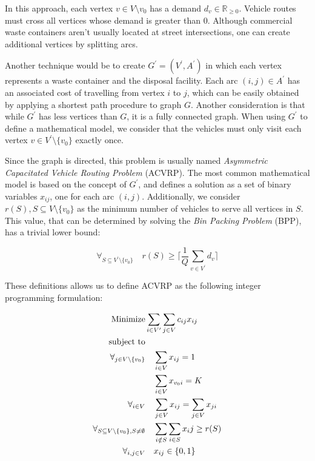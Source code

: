 In this approach, each vertex $v \in V \setminus {v_0}$ has a demand $d_v \in
\mathbb{R}_{\geq0}$. Vehicle routes must cross all vertices whose demand is
greater than $0$. Although commercial waste containers aren't usually located
at street intersections, one can create additional vertices by splitting arcs.

Another technique would be to create $G^\prime = (V^\prime, A^\prime)$ in which
each vertex represents a waste container and the disposal facility. Each arc
$(i, j) \in A^\prime$ has an associated cost of travelling from vertex $i$ to
$j$, which can be easily obtained by applying a shortest path procedure to
graph $G$. Another consideration is that while $G^\prime$ has less vertices
than $G$, it is a fully connected graph. When using $G^\prime$ to define a
mathematical model, we consider that the vehicles must only visit each vertex
$v \in V^\prime \setminus \{v_0\}$ exactly once.

Since the graph is directed, this problem is usually named \textit{Asymmetric
Capacitated Vehicle Routing Problem} (ACVRP).  The most common mathematical
model\citep{Toth01} is based on the concept of $G^\prime$, and defines a
solution as a set of binary variables $x_{ij}$, one for each arc $(i, j)$.
Additionally, we consider $r(S), S \subseteq V \setminus \{v_0\}$ as the
minimum number of vehicles to serve all vertices in $S$. This value, that can
be determined by solving the \textit{Bin Packing Problem} (BPP), has a trivial
lower bound:

\begin{equation}
\forall_{S \subseteq V^\prime \setminus \{v_0\}} \quad r(S) \geq
\lceil\frac{1}{Q} \sum_{v \in V^\prime} d_{v} \rceil
\end{equation}

These definitions allows us to define ACVRP as the following integer
programming formulation:

\begin{align}
	\mbox{Minimize} & \sum_{i \in V^\prime} \sum_{j \in V} c_{ij} x_{ij}
	\\
	\mbox{subject to} & \notag{}
	\\
	\forall_{j \in V \setminus \{v_0\}} & \quad \sum_{i \in V} x_{ij} = 1
	\label{acvrp:indegree}
	\\
	& \quad \sum_{i \in V} x_{v_0i} = K
	\label{acvrp:outdepot}
	\\
	\forall_{i \in V} & \quad \sum_{j \in V} x_{ij} = \sum_{j \in V} x_{ji}
	\label{acvrp:in-out}
	\\
	\forall_{S \subseteq V \setminus \{v_0\}, S \neq \emptyset} & \quad
	\sum_{i \notin S} \sum_{i \in S} x_ij \geq r(S)
	\label{acvrp:capacity}
	\\
	\forall_{i, j \in V} & \quad x_{ij} \in \{0, 1\}
\end{align}

